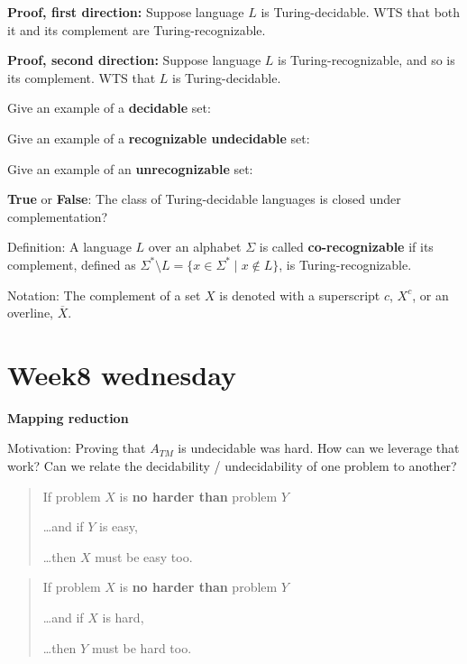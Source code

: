 \documentclass[12pt, oneside]{article}
\begin{document}
{\bf Proof, first direction:}  Suppose  language  $L$ is  Turing-decidable.   WTS  that both it and its complement 
are Turing-recognizable.

\vfill

{\bf Proof, second direction:}  Suppose  language  $L$ is  Turing-recognizable, and  so is  its complement.   WTS  that $L$
is Turing-decidable.
\vfill


Give an example of a {\bf decidable} set: 

\vspace{20pt}

Give an example of a {\bf recognizable undecidable} set: 

\vspace{20pt}

Give an example of an {\bf unrecognizable} set: 

\vspace{20pt}


\newpage

{\bf True} or {\bf False}: The class of Turing-decidable languages is closed under complementation?

\vfill
\vfill
\vfill
Definition: A language $L$ over an  alphabet $\Sigma$ is called {\bf co-recognizable} if its complement,  defined
as $\Sigma^* \setminus L  = \{ x  \in  \Sigma^* \mid x \notin  L \}$, is Turing-recognizable.


Notation: The complement  of a set $X$ is denoted with  a superscript $c$, $X^c$, or an overline,  $\overline{X}$.
 \vfill
\section*{Week8 wednesday}


{\bf Mapping reduction}

Motivation: Proving that $A_{TM}$ is undecidable was hard. How can we leverage that work? 
Can we relate the decidability / undecidability of one problem to another?

\begin{quote}
If problem $X$ is {\bf no harder than} problem $Y$

\ldots and if $Y$ is easy,

\ldots then $X$ must be easy too.
\end{quote}


\begin{quote}
    If problem $X$ is {\bf no harder than} problem $Y$
    
    \ldots and if $X$ is hard,
    
    \ldots then $Y$ must be hard too.
\end{quote}
\end{document}

